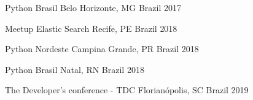 


\begin{cvhonors}


\cvhonor
{Python Brasil} %
{Belo Horizonte, MG} %
{Brazil} %
{2017} %
    

\cvhonor
{Meetup Elastic Search} %
{Recife, PE} %
{Brazil} %
{2018} %
    

\cvhonor
{Python Nordeste} %
{Campina Grande, PR} %
{Brazil} %
{2018} %


\cvhonor
{Python Brasil} %
{Natal, RN} %
{Brazil} %
{2018} %


\cvhonor
{The Developer's conference - TDC} %
{Florianópolis, SC} %
{Brazil} %
{2019} %


\end{cvhonors}